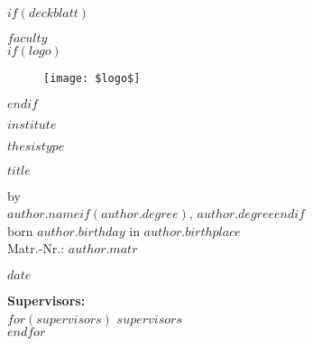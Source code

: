 \documentclass[oneside,12pt,a4paper,bibliography=totocnumbered,numbers=noenddot,table]{scrreprt} %
\begin{document}

$if(deckblatt)$
\begin{titlepage}
\thispagestyle{empty}
\begin{center}

\textsf{\textbf{$faculty$}}\\

$if(logo)$
\begin{figure}[h!]
    \centering
    \texttt{[image: \$logo\$]}
\end{figure}
$endif$

\textsf{\textbf{$institute$}}\\[1,0cm]

\begin{Large}
    \textsf{\textbf{$thesistype$}}\\[0,75cm]
\end{Large}

\begin{LARGE}
    \textsf{\textbf{$title$}}\\[1,5cm]
\end{LARGE}

\begin{large}
    \textsf{by}\\[0,1cm]
    \textsf{\textbf{$author.name$}$if(author.degree)$, $author.degree$$endif$}\\[0,1cm]
    \textsf{born $author.birthday$ in $author.birthplace$}\\[0,1cm]
    \textsf{Matr.-Nr.: $author.matr$}\\[1,5cm]

    \vspace{2cm}

    \textsf{$date$}
\end{large}

\vspace{3cm}

\begin{large}
    \textbf{Supervisors:}\\[0,3cm]
    $for(supervisors)$
    \textsf{$supervisors$}\\[0,3cm]
    $endfor$
\end{large}

\end{center}

\end{titlepage}
\thispagestyle{empty}
\cleardoublepage
\end{document}
